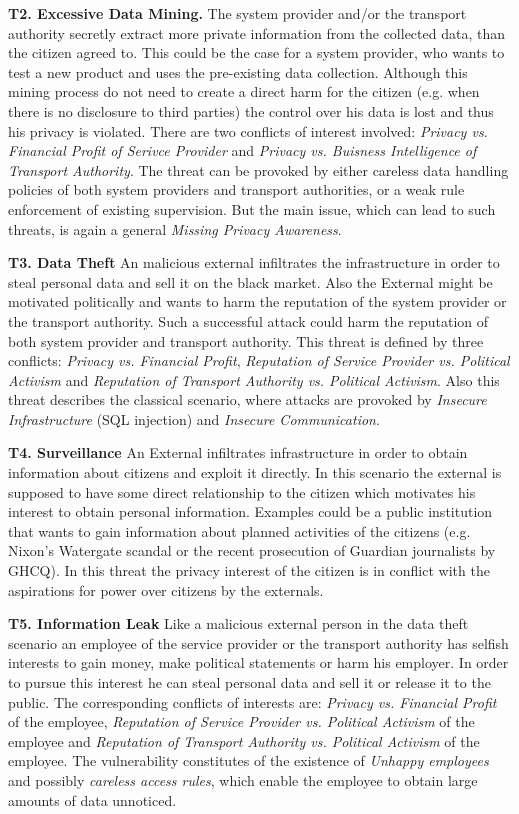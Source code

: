 \documentclass[runningheads,a4paper]{llncs}
\begin{document}
\textbf{T2. Excessive Data Mining.}
The system provider and/or the transport authority secretly extract more private information from the collected data, than the citizen agreed to. This could be the case for a system provider, who wants to test a new product and uses the pre-existing data collection.
Although this mining process do not need to create a direct harm for the citizen (e.g. when there is no disclosure to third parties) the control over his data is lost and thus his privacy is violated. 
There are two conflicts of interest involved: \textit{Privacy vs. Financial Profit of Serivce Provider} and  \textit{Privacy vs. Buisness Intelligence of Transport Authority}.
The threat can be provoked by either careless data handling policies of both system providers and transport authorities, or a weak rule enforcement of existing supervision. But the main issue, which can lead to such threats, is again a general \textit{Missing Privacy Awareness}.

\textbf{T3. Data Theft}
An malicious external infiltrates the infrastructure in order to steal personal data and sell it on the black market. Also the External might be motivated politically and wants to harm the reputation of the system provider or the transport authority. Such a successful attack could harm the reputation of both system provider and transport authority. This threat is defined by three conflicts: \textit{Privacy vs. Financial Profit}, \textit{Reputation of Service Provider vs. Political Activism} and \textit{Reputation of Transport Authority vs. Political Activism}. Also this threat describes the classical scenario, where attacks are provoked by \textit{Insecure Infrastructure} (SQL injection) and \textit{Insecure Communication}.

\textbf{T4. Surveillance}
An External infiltrates infrastructure in order to obtain information
about citizens and exploit it directly.  In this scenario the
external is supposed to have some direct relationship to the citizen
which motivates his interest to obtain personal information.  Examples
could be a public institution that wants to gain information about
planned activities of the citizens (e.g. Nixon's Watergate scandal or
the recent prosecution of Guardian journalists by GHCQ). 
In this threat the privacy interest of the citizen is in conflict with
the aspirations for power over citizens by the externals.

\textbf{T5. Information Leak} 
Like a malicious external person in the data theft scenario an employee of the
service provider or the transport authority has selfish interests to gain
money, make political statements or harm his employer.  In order to
pursue this interest he can steal personal data and sell it or release
it to the public.  The corresponding conflicts of interests are:
\textit{Privacy vs. Financial Profit} of the employee, \textit{Reputation of Service
  Provider vs. Political Activism} of the employee and \textit{Reputation of Transport
  Authority vs. Political Activism} of the employee.  The vulnerability constitutes of
the existence of \textit{Unhappy employees} and possibly \textit{careless access
rules}, which enable the employee to obtain large amounts of data
unnoticed.
\end{document}
